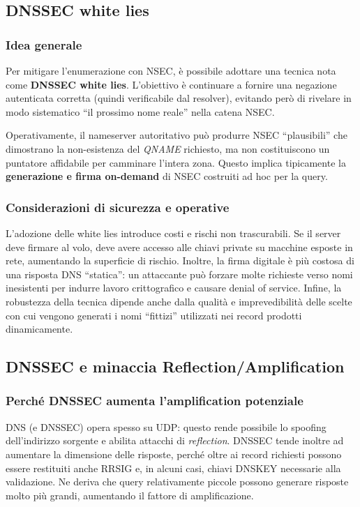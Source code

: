 \subsection{DNSSEC white lies}

\subsubsection{Idea generale}
Per mitigare l’enumerazione con NSEC, è possibile adottare una tecnica nota come \textbf{DNSSEC white lies}. L’obiettivo è continuare a fornire una negazione autenticata corretta (quindi verificabile dal resolver), evitando però di rivelare in modo sistematico “il prossimo nome reale” nella catena NSEC.

Operativamente, il nameserver autoritativo può produrre NSEC “plausibili” che dimostrano la non-esistenza del \emph{QNAME} richiesto, ma non costituiscono un puntatore affidabile per camminare l’intera zona. Questo implica tipicamente la \textbf{generazione e firma on-demand} di NSEC costruiti ad hoc per la query.

\subsubsection{Considerazioni di sicurezza e operative}
L’adozione delle white lies introduce costi e rischi non trascurabili. Se il server deve firmare al volo, deve avere accesso alle chiavi private su macchine esposte in rete, aumentando la superficie di rischio. Inoltre, la firma digitale è più costosa di una risposta DNS “statica”: un attaccante può forzare molte richieste verso nomi inesistenti per indurre lavoro crittografico e causare denial of service. Infine, la robustezza della tecnica dipende anche dalla qualità e imprevedibilità delle scelte con cui vengono generati i nomi “fittizi” utilizzati nei record prodotti dinamicamente.

\subsection{DNSSEC e minaccia Reflection/Amplification}

\subsubsection{Perché DNSSEC aumenta l’amplification potenziale}
DNS (e DNSSEC) opera spesso su UDP: questo rende possibile lo spoofing dell’indirizzo sorgente e abilita attacchi di \emph{reflection}. DNSSEC tende inoltre ad aumentare la dimensione delle risposte, perché oltre ai record richiesti possono essere restituiti anche RRSIG e, in alcuni casi, chiavi DNSKEY necessarie alla validazione. Ne deriva che query relativamente piccole possono generare risposte molto più grandi, aumentando il fattore di amplificazione.

